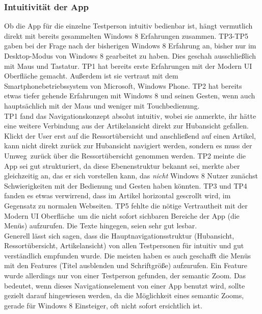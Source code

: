 \documentclass[12pt,a4paper,bibtotoc]{scrartcl}
\begin{document}
\subsubsection{Intuitivität der App} 
\label{subsubsec:intuitivitätderapp}
Ob die App für die einzelne Testperson intuitiv bedienbar ist, hängt vermutlich direkt mit bereits gesammelten Windows 8 Erfahrungen zusammen. TP3-TP5 gaben bei der Frage nach der bisherigen Windows 8 Erfahrung an, bisher nur im Desktop-Modus von Windows 8 gearbeitet zu haben. Dies geschah ausschließlich mit Maus und Tastatur. TP1 hat bereits erste Erfahrungen mit der Modern UI Oberfläche gemacht. Außerdem ist sie vertraut mit dem Smartphonebetriebssystem von Microsoft, Windows Phone. TP2 hat bereits etwas tiefer gehende Erfahrungen mit Windows 8 und seinen Gesten, wenn auch hauptsächlich mit der Maus und weniger mit Touchbedienung.\\

TP1 fand das Navigationskonzept \glqq absolut intuitiv\grqq, wobei sie anmerkte, ihr hätte eine weitere Verbindung aus der Artikelansicht direkt zur Hubansicht gefallen. Klickt der User erst auf die Ressortübersicht und anschließend auf einen Artikel, kann nicht direkt zurück zur Hubansicht navigiert werden, sondern es muss der \glqq Umweg\grqq\ zurück über die Ressortübersicht genommen werden. TP2 meinte die App sei gut strukturiert, da diese Ebenenstruktur bekannt sei, merkte aber gleichzeitig an, das er sich vorstellen kann, das \textit{nicht} Windows 8 Nutzer zunächst Schwierigkeiten mit der Bedienung und Gesten haben könnten. TP3 und TP4 fanden es etwas verwirrend, dass im Artikel horizontal gescrollt wird, im Gegensatz zu normalen Webseiten. TP5 \glqq fehlte die nötige Vertrautheit mit der Modern UI Oberfläche\grqq\ um die nicht sofort sichbaren Bereiche der App (die Menüs) aufzurufen. Die Texte hingegen, seien sehr gut lesbar.\\

Generell lässt sich sagen, dass die Hauptnavigationsstruktur (Hubansicht, Ressortübersicht, Artikelansicht) von allen Testpersonen für intuitiv und gut verständlich empfunden wurde. Die meisten haben es auch geschafft die Menüs mit den Features (Titel ausblenden und Schriftgröße) aufzurufen. Ein Feature wurde allerdings nur von einer Testperson gefunden, der semantic Zoom. Das bedeutet, wenn dieses Navigationselement von einer App benutzt wird, sollte gezielt darauf hingewiesen werden, da die Möglichkeit eines semantic Zooms, gerade für Windows 8 Einsteiger, oft nicht sofort ersichtlich ist.
\end{document}
